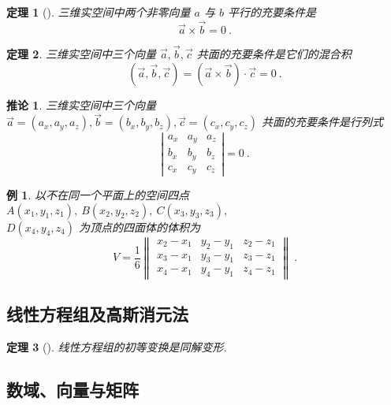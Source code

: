 \documentclass[zihao=-4,UTF8,linespread=1.8,nothm]{aytony_base}
\newtheorem{theorem}{\indent 定理}[subsection]
\newtheorem*{corollary}{\indent 推论}
\newtheorem{example}{\indent 例}[subsection]
\begin{document}
\begin{theorem}[]
    三维实空间中两个非零向量 $a$ 与 $b$ 平行的充要条件是 $$
        \vec{a} \times \vec{b} = 0\ .
    $$
\end{theorem}

\begin{theorem}
    三维实空间中三个向量 $\vec{a},\vec{b},\vec{c}$ 共面的充要条件是它们的混合积 $$
        (\vec{a}, \vec{b}, \vec{c}) = (\vec{a} \times \vec{b}) \cdot \vec{c} = 0\ .
    $$
\end{theorem}

\begin{corollary}
    三维实空间中三个向量 $\vec{a} = (a_x, a_y, a_z), \vec{b} = (b_x, b_y, b_z), \vec{c} = (c_x, c_y, c_z)$ 共面的充要条件是行列式 $$
        \left|
        \begin{matrix}
            a_x & a_y & a_z \\
            b_x & b_y & b_z \\
            c_x & c_y & c_z
        \end{matrix}
        \right| = 0\ .
    $$
\end{corollary}

\setcounter{example}{3}

\begin{example}
    以不在同一个平面上的空间四点 $A(x_1, y_1, z_1),\ B(x_2, y_2, z_2),\ C(x_3, y_3, z_3),$\\ $D(x_4, y_4, z_4)$ 为顶点的四面体的体积为 $$
        V = \dfrac{1}{6} \left\|
        \begin{matrix}
            x_2-x_1 & y_2-y_1 & z_2-z_1 \\
            x_3-x_1 & y_3-y_1 & z_3-z_1 \\
            x_4-x_1 & y_4-y_1 & z_4-z_1
        \end{matrix}
        \right\|\ .
    $$
\end{example}

\subsection{线性方程组及高斯消元法}

\begin{theorem}[]
    线性方程组的初等变换是同解变形.
\end{theorem}

\subsection{数域、向量与矩阵}
\end{document}
